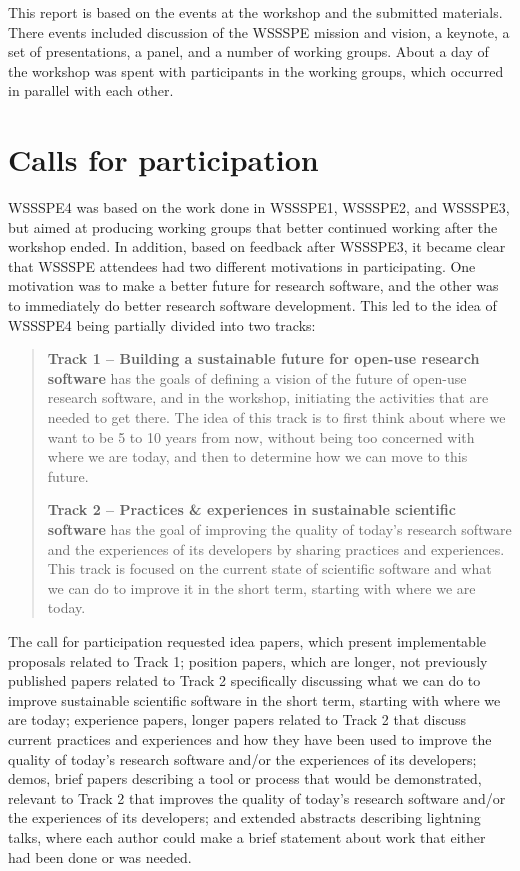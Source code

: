 \documentclass[11pt, oneside]{amsart}
\begin{document}
This report is based on the events at the workshop and the submitted materials.
There events included discussion of the WSSSPE mission and vision, a keynote,
a set of presentations, a panel, and a number of working groups.  About a day of the
workshop was spent with participants in the working groups, which occurred in parallel
with each other.

\section{Calls for participation} \label{sec:preworkshop}

WSSSPE4 was based on the work done in WSSSPE1, WSSSPE2, and WSSSPE3, but aimed
at producing working groups that better continued working after the workshop ended.
In addition, based on feedback after WSSSPE3, it became clear that WSSSPE attendees
had two different motivations in participating.  One motivation was to make a better future
for research software, and the other was to immediately do better research software development.
This led to the idea of WSSSPE4 being partially divided into two tracks:

\begin{quote}
    \textbf{Track 1 -- Building a sustainable future for open-use research
    software} has the goals of defining a vision of the future of open-use
    research software, and in the workshop, initiating the activities that are
    needed to get there. The idea of this track is to first think about where
    we want to be 5 to 10 years from now, without being too concerned with
    where we are today, and then to determine how we can move to this future.

    \noindent \textbf{Track 2 -- Practices \& experiences in sustainable scientific software}
    has the goal of improving the quality of today's research software and the
    experiences of its developers by sharing practices and experiences.
    This track is focused on the current state of scientific software and what
    we can do to improve it in the short term, starting with where we are today.
\end{quote}

The call for participation requested
idea papers, which present implementable proposals related to Track 1;
position papers, which are longer, not previously published papers related to
Track 2 specifically discussing what we can do to improve sustainable scientific
software in the short term, starting with where we are today;
experience papers, longer papers related to Track 2 that discuss current
practices and experiences and how they have been used to improve the quality of
today's research software and/or the experiences of its developers;
demos, brief papers describing a tool or
process that would be demonstrated, relevant to Track 2 that improves the quality of today's research
software and\slash or the experiences of its developers; and
extended abstracts describing lightning talks,
where each author could make a brief statement about work that either had been
done or was needed.
\end{document}
